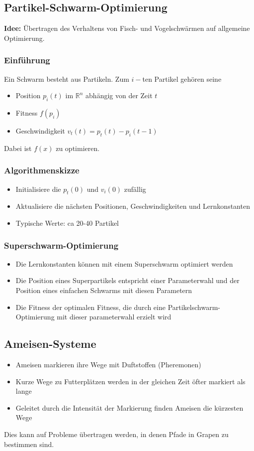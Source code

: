 \subsection{Partikel-Schwarm-Optimierung}
\textbf{Idee:} Übertragen des Verhaltens von Fisch- und Vogelschwärmen auf allgemeine Optimierung.

\subsubsection{Einführung}
Ein Schwarm besteht aus Partikeln. Zum \(i-\)ten Partikel gehören seine
\begin{itemize}
	\item Position \(p_i(t)\) im \(\mathbb{R}^n\) abhängig von der Zeit \(t\)
	\item Fitness \(f(p_i)\)
	\item Geschwindigkeit \(v_t(t) = p_t(t)-p_i(t-1)\)
\end{itemize}
Dabei ist \(f(x)\) zu optimieren.

\subsubsection{Algorithmenskizze}
\begin{itemize}
	\item Initialisiere die \(p_t(0)\) und \(v_i(0)\) zufällig
	\item Aktualisiere die nächsten Positionen, Geschwindigkeiten und Lernkonstanten
	\item Typische Werte: ca 20-40 Partikel
\end{itemize}

\subsubsection{Superschwarm-Optimierung}
\begin{itemize}
	\item Die Lernkonstanten können mit einem Superschwarm optimiert werden
	\item Die Position eines Superpartikels entspricht einer Parameterwahl und der Position eines einfachen Schwarms mit diesen Parametern
	\item Die Fitness der optimalen Fitness, die durch eine Partikelschwarm-Optimierung mit dieser parameterwahl erzielt wird
\end{itemize}


\subsection{Ameisen-Systeme}
\begin{itemize}
	\item Ameisen markieren ihre Wege mit Duftstoffen (Pheremonen)
	\item Kurze Wege zu Futterplätzen werden in der gleichen Zeit öfter markiert als lange
	\item Geleitet durch die Intensität der Markierung finden Ameisen die kürzesten Wege
\end{itemize}
Dies kann auf Probleme übertragen werden, in denen Pfade in Grapen zu bestimmen sind.

